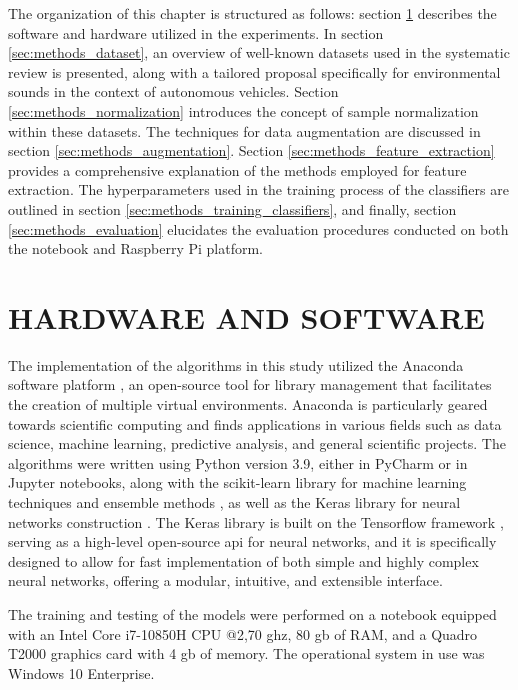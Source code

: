 The organization of this chapter is structured as follows: section \ref{sec:methods_HWSW} describes the software and hardware utilized in the experiments. In section \ref{sec:methods_dataset}, an overview of well-known datasets used in the systematic review is presented, along with a tailored proposal specifically for environmental sounds in the context of autonomous vehicles. Section \ref{sec:methods_normalization} introduces the concept of sample normalization within these datasets. The techniques for data augmentation are discussed in section \ref{sec:methods_augmentation}. Section \ref{sec:methods_feature_extraction} provides a comprehensive explanation of the methods employed for feature extraction. The hyperparameters used in the training process of the classifiers are outlined in section \ref{sec:methods_training_classifiers}, and finally, section \ref{sec:methods_evaluation} elucidates the evaluation procedures conducted on both the notebook and Raspberry Pi platform.


\section{HARDWARE AND SOFTWARE}
\label{sec:methods_HWSW}

The implementation of the algorithms in this study utilized the Anaconda software platform \cite{Anaconda86}, an open-source tool for library management that facilitates the creation of multiple virtual environments. Anaconda is particularly geared towards scientific computing and finds applications in various fields such as data science, machine learning, predictive analysis, and general scientific projects. The algorithms were written using Python version 3.9, either in PyCharm or in Jupyter notebooks, along with the scikit-learn library for machine learning techniques and ensemble methods \cite{scikitle61}, as well as the Keras library for neural networks construction \cite{KerasDee32}. The Keras library is built on the Tensorflow framework \cite{TensorFl23}, serving as a high-level open-source \gls{api} for neural networks, and it is specifically designed to allow for fast implementation of both simple and highly complex neural networks, offering a modular, intuitive, and extensible interface. 

The training and testing of the models were performed on a notebook equipped with an Intel\textregistered{} Core\texttrademark{} i7-10850H CPU @2,70 \gls{g}\gls{hz}, 80 \gls{g}\gls{b} of RAM, and a Quadro T2000 graphics card with 4 \gls{g}\gls{b} of memory. The operational system in use was Windows 10 Enterprise.

